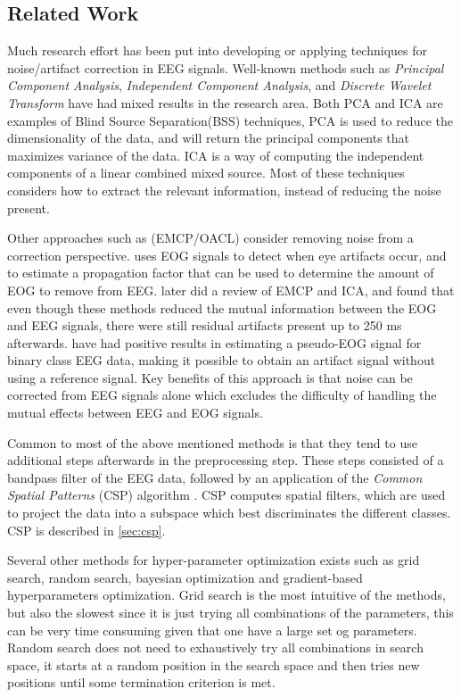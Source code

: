 \subsection{Related Work}
Much research effort has been put into developing or applying techniques for noise/artifact correction in EEG signals. Well-known methods such as \emph{Principal Component Analysis}, \emph{Independent Component Analysis}, and \emph{Discrete Wavelet Transform} have had mixed results in the research area. Both PCA and ICA are examples of Blind Source Separation(BSS) techniques, PCA is used to reduce the dimensionality of the data, and will return the principal components that maximizes variance of the data. ICA is a way of computing the independent components of a linear combined mixed source.    Most of these techniques considers how to extract the relevant information, instead of reducing the noise present.

Other approaches such as (EMCP/OACL) consider removing noise from a correction perspective. \cite{gratton1983new} uses EOG signals to detect when eye artifacts occur, and to estimate a propagation factor that can be used to determine the amount of EOG to remove from EEG. \cite{hoffmann2008correction} later did a review of EMCP and ICA, and found that even though these methods reduced the mutual information between the EOG and EEG signals, there were still residual artifacts present up to 250 ms afterwards. \cite{li2015ocular} have had positive results in estimating a pseudo-EOG signal for binary class EEG data, making it possible to obtain an artifact signal without using a reference signal. Key benefits of this approach is that noise can be corrected from EEG signals alone which excludes the difficulty of handling the mutual effects between EEG and EOG signals.

Common to most of the above mentioned methods is that they tend to use additional steps afterwards in the preprocessing step. These steps consisted of a bandpass filter of the EEG data, followed by an application of the \emph{Common Spatial Patterns} (CSP) algorithm \citep{ramoser2000optimal}. CSP computes spatial filters, which are used to project the data into a subspace which best discriminates the different classes. CSP is described in \cref{sec:csp}.

Several other methods for hyper-parameter optimization exists such as grid search, random search, bayesian optimization and gradient-based hyperparameters optimization. Grid search is the most intuitive of the methods, but also the slowest since it is just trying all combinations of the parameters, this can be very time consuming given that one have a large set og parameters. Random search does not need to exhaustively try all combinations in search space, it starts at a random position in the search space and then tries new positions until some termination criterion is met. 
